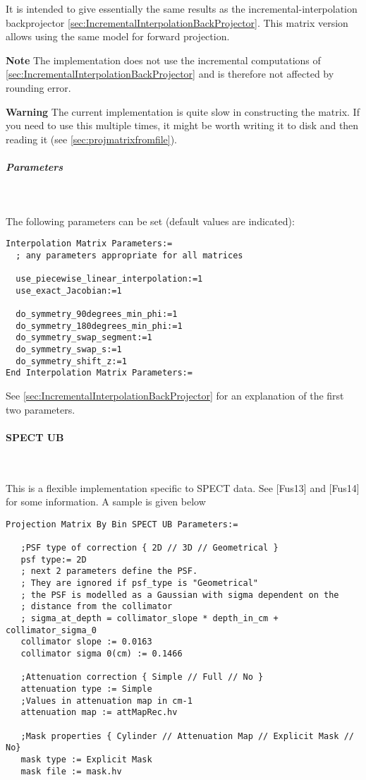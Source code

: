 \documentclass{article}
\newcommand{\subsubsubsection}[1]{\paragraph{#1}\mbox{} \\}
\newcommand{\subsubsubsubsection}[1]{\subparagraph{#1} \mbox{} \\}
\begin{document}
{{{It is intended to give
essentially the same results as the incremental-interpolation backprojector
\ref{sec:IncrementalInterpolationBackProjector}.
This matrix version allows using the same model for forward projection. 

\textbf{Note} The implementation does not use the incremental computations of 
\ref{sec:IncrementalInterpolationBackProjector} and is therefore not affected 
by rounding error.

\textbf{Warning} The current implementation is quite slow in constructing the matrix.
If you need to use this multiple times, it might be worth writing it to disk and
then reading it (see \ref{sec:projmatrixfromfile}).

{ \subsubsubsubsection{Parameters}
}
The following parameters can be set (default values are indicated):
\begin{verbatim}
Interpolation Matrix Parameters:=
  ; any parameters appropriate for all matrices

  use_piecewise_linear_interpolation:=1
  use_exact_Jacobian:=1

  do_symmetry_90degrees_min_phi:=1
  do_symmetry_180degrees_min_phi:=1
  do_symmetry_swap_segment:=1
  do_symmetry_swap_s:=1
  do_symmetry_shift_z:=1
End Interpolation Matrix Parameters:=
\end{verbatim}

See \ref{sec:IncrementalInterpolationBackProjector} for an explanation 
of the first two parameters.

{ \subsubsubsection{SPECT UB}
}
\label{sec:projmatrixSPECTUB}
This is a flexible implementation specific to SPECT data. See [Fus13] and [Fus14] for some information.
A sample is given below

\begin{verbatim}
Projection Matrix By Bin SPECT UB Parameters:=

   ;PSF type of correction { 2D // 3D // Geometrical }
   psf type:= 2D
   ; next 2 parameters define the PSF. 
   ; They are ignored if psf_type is "Geometrical"
   ; the PSF is modelled as a Gaussian with sigma dependent on the 
   ; distance from the collimator
   ; sigma_at_depth = collimator_slope * depth_in_cm + collimator_sigma_0
   collimator slope := 0.0163
   collimator sigma 0(cm) := 0.1466

   ;Attenuation correction { Simple // Full // No }
   attenuation type := Simple
   ;Values in attenuation map in cm-1
   attenuation map := attMapRec.hv

   ;Mask properties { Cylinder // Attenuation Map // Explicit Mask // No}
   mask type := Explicit Mask
   mask file := mask.hv


\end{verbatim}}}}
\end{document}
